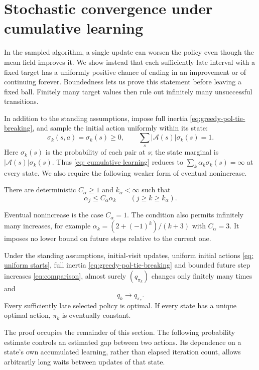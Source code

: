 \section{Stochastic convergence under cumulative learning}
In the sampled algorithm, a single update can worsen the policy even though the mean field improves it. We show instead that each sufficiently late interval with a fixed target has a uniformly positive chance of ending in an improvement or of continuing forever. Boundedness lets us prove this statement before leaving a fixed ball. Finitely many target values then rule out infinitely many unsuccessful transitions.

In addition to the standing assumptions, impose full inertia \eqref{eq:greedy-pol-tie-breaking}, and sample the initial action uniformly within its state:
\begin{equation}\label{eq: uniform starts}
\sigma_k(s,a)=\sigma_k(s)\ge0,\qquad
\sum_s|\mathcal A(s)|\sigma_k(s)=1.
\end{equation}
Here $\sigma_k(s)$ is the probability of each pair at $s$; the state marginal is $|\mathcal A(s)|\sigma_k(s)$. Thus \eqref{eq: cumulative learning} reduces to $\sum_k\alpha_k\sigma_k(s)=\infty$ at every state. We also require the following weaker form of eventual nonincrease.
\begin{assumption}\label{asp: additional conditions on learning rate}
There are deterministic $C_\alpha\ge1$ and $k_\alpha<\infty$ such that
\begin{equation}\label{eq:comparison}
\alpha_j\le C_\alpha\alpha_k\qquad(j\ge k\ge k_\alpha).
\end{equation}
\end{assumption}
Eventual nonincrease is the case $C_\alpha=1$. The condition also permits infinitely many increases, for example $\alpha_k=(2+(-1)^k)/(k+3)$ with $C_\alpha=3$. It imposes no lower bound on future steps relative to the current one.

\begin{theorem}\label{thm: convergence mcopi uniform}
Under the standing assumptions, initial-visit updates, uniform initial actions \eqref{eq: uniform starts}, full inertia \eqref{eq:greedy-pol-tie-breaking} and bounded future step increases \eqref{eq:comparison}, almost surely $(q_{\pi_k})$ changes only finitely many times and
\[
q_k\longrightarrow q_{\pi_*}.
\]
Every sufficiently late selected policy is optimal. If every state has a unique optimal action, $\pi_k$ is eventually constant.
\end{theorem}
The proof occupies the remainder of this section. The following probability estimate controls an estimated gap between two actions. Its dependence on a state's own accumulated learning, rather than elapsed iteration count, allows arbitrarily long waits between updates of that state.
